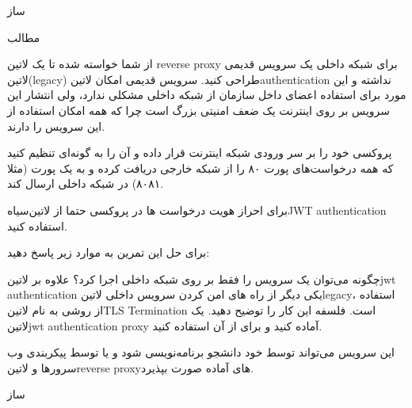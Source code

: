 \documentclass{../assignment}
\begin{document}
‌ساز

‌مطالب



از شما خواسته شده تا یک ‌لاتین {reverse proxy} برای شبکه داخلی یک سرویس قدیمی ‌لاتین{(legacy)} طراحی کنید.
سرویس قدیمی امکان ‌لاتین{authentication} نداشته و این مورد برای استفاده اعضای داخل سازمان از شبکه داخلی مشکلی ندارد، ولی انتشار این سرویس بر روی اینترنت یک ضعف امنیتی بزرگ است چرا که همه امکان استفاده از این سرویس را دارند.

پروکسی خود را بر سر ورودی شبکه اینترنت قرار داده و آن را به گونه‌ای تنظیم کنید که همه درخواست‌های پورت ۸۰ را از شبکه خارجی دریافت کرده و به یک پورت (مثلا ۸۰۸۱) در شبکه داخلی ارسال کند.

برای احراز هویت درخواست ها در پروکسی حتما از ‌لاتین{‌سیاه{JWT authentication}} استفاده کنید.

برای حل این تمرین به موارد زیر پاسخ دهید:

 چگونه می‌توان یک سرویس را فقط بر روی شبکه داخلی اجرا کرد؟
 علاوه بر ‌لاتین{jwt authentication} یکی دیگر از راه های امن کردن سرویس داخلی ‌لاتین{legacy}، استفاده از روشی به نام ‌لاتین{TLS Termination} است. فلسفه این کار را توضیح دهید.
 یک ‌لاتین{jwt authentication proxy} آماده کنید و برای  از آن استفاده کنید.

این سرویس می‌تواند توسط خود دانشجو برنامه‌نویسی شود و یا توسط پیکربندی وب سرورها و ‌لاتین{reverse proxy}های آماده صورت بپذیرد.

‌ساز
\end{document}
